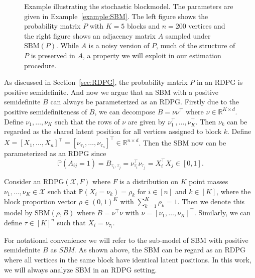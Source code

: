 \begin{figure}
\begin{subfigure}{.45\textwidth}
\end{subfigure}
\caption[Example illustrating the stochastic blockmodel]{Example illustrating the stochastic blockmodel. The parameters are given in Example~\ref{example:SBM}.
The left figure shows the probability matrix $P$ with $K = 5$ blocks and $n=200$ vertices and the right figure shows an adjacency matrix $A$ sampled under $\mathrm{SBM}(P)$.
While $A$ is a noisy version of $P$, much of the structure of $P$ is preserved in $A$, a property we will exploit in our estimation procedure.}
\label{fig:SBM_example}
\end{figure}

As discussed in Section~\ref{sec:RDPG}, the probability matrix $P$ in an RDPG is positive semidefinite. And now we argue that an SBM with a positive semidefinite $B$ can always be parameterized as an RDPG.
Firstly due to the positive semidefiniteness of $B$, we can decompose $B = \nu \nu^{\top}$ where $\nu \in \mathbb{R}^{K \times d}$. Define $\nu_1, \dots, \nu_K$ such that the rows of $\nu$ are given by $\nu_1^{\top}, \dots, \nu_K^{\top}$. Then $\nu_k$ can be regarded as the shared latent position for all vertices assigned to block $k$. Define $X = [X_1, \dots, X_n]^{\top} = [\nu_{\tau_1}, \dots, \nu_{\tau_n}]^{\top} \in \mathbb{R}^{n \times d}$. Then the SBM now can be parameterized as an RDPG since
\[
	\mathbb{P}(A_{ij} = 1) = B_{\tau_i, \tau_j} = \nu_{\tau_i}^{\top} \nu_{\tau_j}^{\phantom{\top}} = X_i^{\top} X_j \in [0, 1].
\]


\begin{definition} 
\label{def:SBM_RDPG}
Consider an $\mathrm{RDPG}(\mathcal{X}, F)$ where $F$ is a distribution on $K$ point masses $\nu_1, \dots, \nu_K \in \mathcal{X}$ such that $\mathbb{P}(X_i = \nu_k) = \rho_k$ for $i \in [n]$ and $k \in [K]$, where the block proportion vector $\rho \in (0,1)^K$ with $\sum_{k=1}^K \rho_k = 1$. Then we denote this model by $\mathrm{SBM}(\rho, B)$ where $B = \nu^{\top} \nu$ with $\nu = [\nu_1, \dots, \nu_K]^{\top}$. Similarly, we can define $\tau \in [K]^n$ such that $X_i = \nu_{\tau_i}$. 
\end{definition}

For notational convenience we will refer to the sub-model of SBM with positive semidefinite $B$ as {\em{SBM}}.
As shown above, the SBM can be regard as an RDPG where all vertices in the same block have identical latent positions. In this work, we will always analyze SBM in an RDPG setting.


